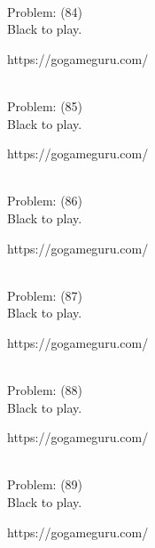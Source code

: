 \documentclass[11pt]{article}
\begin{document}
\begin{minipage}[t]{0.5\textwidth}
  {\centering
  
\\
Problem: (84)\\
Black to play.

https://gogameguru.com/\\
  }
\end{minipage}
\begin{minipage}[t]{0.5\textwidth}
  {\centering
  
\\
Problem: (85)\\
Black to play.

https://gogameguru.com/\\
  }
\end{minipage}
\begin{minipage}[t]{0.5\textwidth}
  {\centering
  
\\
Problem: (86)\\
Black to play.

https://gogameguru.com/\\
  }
\end{minipage}
\begin{minipage}[t]{0.5\textwidth}
  {\centering
  
\\
Problem: (87)\\
Black to play.

https://gogameguru.com/\\
  }
\end{minipage}
\begin{minipage}[t]{0.5\textwidth}
  {\centering
  
\\
Problem: (88)\\
Black to play.

https://gogameguru.com/\\
  }
\end{minipage}
\begin{minipage}[t]{0.5\textwidth}
  {\centering
  
\\
Problem: (89)\\
Black to play.

https://gogameguru.com/\\
  }
\end{minipage}
\end{document}
